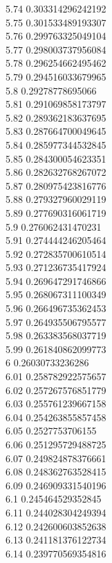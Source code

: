 {5.74	0.303314296242192\\
5.75	0.301533489193307\\
5.76	0.299763325049104\\
5.77	0.298003737956084\\
5.78	0.296254662495462\\
5.79	0.294516033679965\\
5.8	0.29278778695066\\
5.81	0.291069858173797\\
5.82	0.289362183637695\\
5.83	0.287664700049645\\
5.84	0.285977344532845\\
5.85	0.284300054623351\\
5.86	0.282632768267072\\
5.87	0.280975423816776\\
5.88	0.279327960029119\\
5.89	0.277690316061719\\
5.9	0.276062431470231\\
5.91	0.274444246205464\\
5.92	0.272835700610514\\
5.93	0.271236735417924\\
5.94	0.269647291746866\\
5.95	0.268067311100349\\
5.96	0.266496735362453\\
5.97	0.264935506795577\\
5.98	0.263383568037719\\
5.99	0.261840862099773\\
6	0.26030733236286\\
6.01	0.258782922575657\\
6.02	0.257267576851779\\
6.03	0.255761239667158\\
6.04	0.254263855857458\\
6.05	0.2527753706155\\
6.06	0.251295729488725\\
6.07	0.249824878376661\\
6.08	0.248362763528415\\
6.09	0.246909331540196\\
6.1	0.245464529352845\\
6.11	0.244028304249394\\
6.12	0.242600603852638\\
6.13	0.241181376122734\\
6.14	0.239770569354816\\
}
